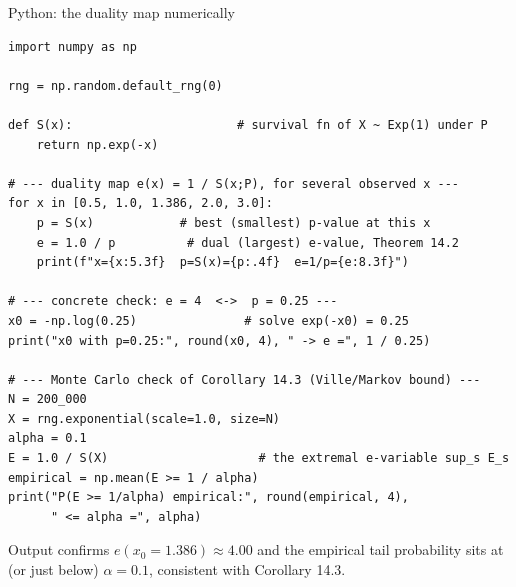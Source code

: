 \documentclass[aspectratio=169,10pt]{beamer}
\begin{document}
\begin{frame}[fragile]{Python: the duality map numerically}
  \begin{lstlisting}
import numpy as np

rng = np.random.default_rng(0)

def S(x):                       # survival fn of X ~ Exp(1) under P
    return np.exp(-x)

# --- duality map e(x) = 1 / S(x;P), for several observed x ---
for x in [0.5, 1.0, 1.386, 2.0, 3.0]:
    p = S(x)            # best (smallest) p-value at this x
    e = 1.0 / p          # dual (largest) e-value, Theorem 14.2
    print(f"x={x:5.3f}  p=S(x)={p:.4f}  e=1/p={e:8.3f}")

# --- concrete check: e = 4  <->  p = 0.25 ---
x0 = -np.log(0.25)               # solve exp(-x0) = 0.25
print("x0 with p=0.25:", round(x0, 4), " -> e =", 1 / 0.25)

# --- Monte Carlo check of Corollary 14.3 (Ville/Markov bound) ---
N = 200_000
X = rng.exponential(scale=1.0, size=N)
alpha = 0.1
E = 1.0 / S(X)                     # the extremal e-variable sup_s E_s
empirical = np.mean(E >= 1 / alpha)
print("P(E >= 1/alpha) empirical:", round(empirical, 4),
      " <= alpha =", alpha)
  \end{lstlisting}
  \small Output confirms $e(x_0{=}1.386)\approx 4.00$ and the empirical
  tail probability sits at (or just below) $\alpha = 0.1$, consistent with
  Corollary 14.3.
\end{frame}
\end{document}
